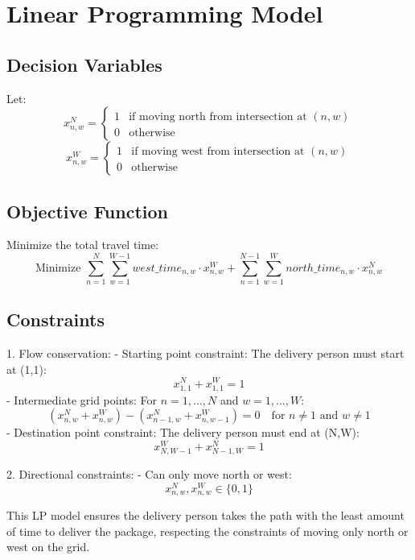 \documentclass{article}
\begin{document}
\section*{Linear Programming Model}

\subsection*{Decision Variables}

Let:
\[
x_{n,w}^N = \left\{
\begin{array}{ll}
1 & \text{if moving north from intersection at } (n, w) \\
0 & \text{otherwise}
\end{array}
\right.
\]
\[
x_{n,w}^W = \left\{
\begin{array}{ll}
1 & \text{if moving west from intersection at } (n, w) \\
0 & \text{otherwise}
\end{array}
\right.
\]

\subsection*{Objective Function}

Minimize the total travel time:
\[
\text{Minimize } \sum_{n=1}^{N} \sum_{w=1}^{W-1} west\_time_{n,w} \cdot x_{n,w}^W + \sum_{n=1}^{N-1} \sum_{w=1}^{W} north\_time_{n,w} \cdot x_{n,w}^N
\]

\subsection*{Constraints}

1. Flow conservation:
   - Starting point constraint: The delivery person must start at (1,1):
   \[
   x_{1,1}^N + x_{1,1}^W = 1
   \]
   - Intermediate grid points:
   For \(n = 1, \ldots, N\) and \(w = 1, \ldots, W\):
   \[
   (x_{n,w}^N + x_{n,w}^W) - (x_{n-1,w}^N + x_{n,w-1}^W) = 0 \quad \text{for } n \neq 1 \text{ and } w \neq 1
   \]
   - Destination point constraint: The delivery person must end at (N,W):
   \[
   x_{N,W-1}^W + x_{N-1,W}^N = 1
   \]

2. Directional constraints:
   - Can only move north or west:
   \[
   x_{n,w}^N, x_{n,w}^W \in \{0, 1\}
   \]

This LP model ensures the delivery person takes the path with the least amount of time to deliver the package, respecting the constraints of moving only north or west on the grid.
\end{document}
